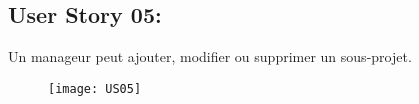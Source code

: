 \newpage
\subsection{User Story 05:}
Un manageur peut ajouter, modifier ou supprimer un sous-projet.


\begin{figure}[!h]
  \begin{center}
        \texttt{[image: US05]}
        \label{US05-dia}
  \end{center}
\end{figure}